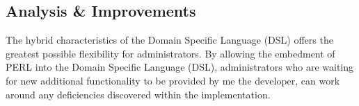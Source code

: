 	\subsection{Analysis \& Improvements}
	
		\normalsize
		{
			The hybrid characteristics of the Domain Specific Language (DSL) offers the greatest possible flexibility for administrators.
			By allowing the embedment of PERL into the Domain Specific Language (DSL), administrators who are waiting for new additional functionality to be provided 
			by me the developer, can work around any deficiencies discovered within the implementation.
		}
	
\newpage
	

